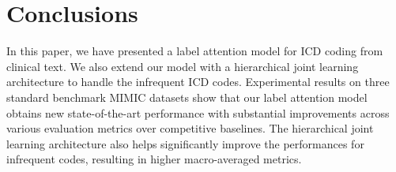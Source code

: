 \documentclass{article}
\begin{document}
\section{Conclusions}In this paper, we have presented a label attention model for ICD coding from clinical text. We also extend our model with a hierarchical joint learning architecture to handle the infrequent ICD codes. Experimental results on three standard benchmark MIMIC datasets show that our label attention model obtains new state-of-the-art performance with substantial improvements across various evaluation metrics over competitive baselines. The hierarchical joint learning architecture also helps significantly improve the performances for infrequent codes, resulting in higher macro-averaged metrics.





\end{document}
